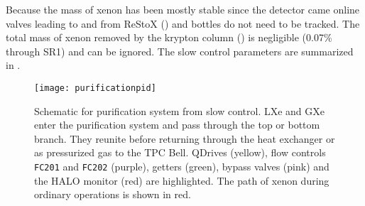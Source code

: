 Because the mass of xenon has been mostly stable since the detector came online valves
leading to and from ReStoX () and bottles do not need to be tracked.  The total mass of xenon removed by the
krypton column () is negligible (0.07\% through SR1) and
can be ignored.  The slow control parameters are summarized in .

\begin{table}
\centering
{}
\caption{Parameters queried from the slow control system to calculate $F_{\mathrm{G}}$ and $F_{\mathrm{L}}$.  Those in
 are highlighted in the color listed.}
\label{tab:electron_lifetime_model_removal_slow_control_pars}
\end{table}

\begin{figure}
\centering
\texttt{[image: purificationpid]}
\caption{Schematic for purification system from slow control.  LXe and GXe enter the purification system and pass through the top or
bottom branch.  They reunite before returning through the heat exchanger or as pressurized gas to the TPC Bell.  QDrives (yellow),
flow controls \texttt{FC201} and \texttt{FC202} (purple), getters (green), bypass valves (pink) and the HALO monitor (red) are
highlighted.  The path of xenon during ordinary operations is shown in red.}
\label{fig:electron_lifetime_model_slow_control_pur}
\end{figure}

